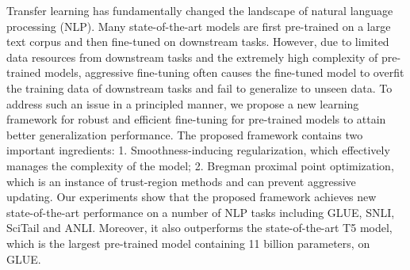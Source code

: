 Transfer learning has fundamentally changed the landscape of natural language processing (NLP). Many state-of-the-art models are first pre-trained on a large text corpus and then fine-tuned on downstream tasks. However, due to limited data resources from downstream tasks and the extremely high complexity of pre-trained models, aggressive fine-tuning often causes the fine-tuned model to overfit the training data of downstream tasks and fail to generalize to unseen data. To address such an issue in a principled manner, we propose a new learning framework for robust and efficient fine-tuning for pre-trained models to attain better generalization performance. The proposed framework contains two important ingredients: 1. Smoothness-inducing regularization, which effectively manages the complexity of the model; 2.  Bregman proximal point optimization, which is an instance of trust-region methods and can prevent aggressive updating. Our experiments show that the proposed framework achieves new state-of-the-art performance on a number of NLP tasks including GLUE, SNLI, SciTail and ANLI. Moreover, it also outperforms the state-of-the-art T5 model, which is the largest pre-trained model containing 11 billion parameters, on GLUE.
